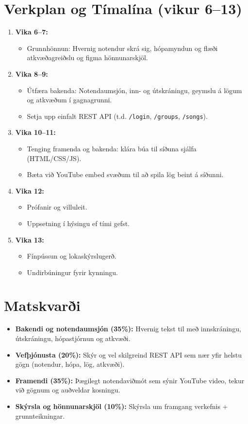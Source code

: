 \documentclass{article}
\begin{document}
\section{Verkplan og Tímalína (vikur 6--13)}
\begin{enumerate}[label=\arabic*.]
    \item \textbf{Vika 6--7:}  
    \begin{itemize}
        \item Grunnhönnun: Hvernig notendur skrá sig, hópamyndun og flæði atkvæðagreiðslu og figma hönnunarskjöl.
    \end{itemize}
    \item \textbf{Vika 8--9:}  
    \begin{itemize}
        \item Útfæra bakenda: Notendaumsjón, inn- og útskráningu, geymslu á lögum og atkvæðum í gagnagrunni.
        \item Setja upp einfalt REST API (t.d. \texttt{/login}, \texttt{/groups}, \texttt{/songs}).
    \end{itemize}
    \item \textbf{Vika 10--11:}  
    \begin{itemize}
        \item Tenging framenda og bakenda: klára búa til síðuna sjálfa (HTML/CSS/JS).
        \item Bæta við YouTube embed svæðum til að spila lög beint á síðunni.
    \end{itemize}
    \item \textbf{Vika 12:}  
    \begin{itemize}
        \item Prófanir og villuleit.
        \item Uppsetning í hýsingu ef tími gefst.
    \end{itemize}
    \item \textbf{Vika 13:}  
    \begin{itemize}
        \item Fínpússun og lokaskýrslugerð.
        \item Undirbúningur fyrir kynningu.
    \end{itemize}
\end{enumerate}

\section{Matskvarði}
\begin{itemize}
    \item \textbf{Bakendi og notendaumsjón (35\%):}  
    Hvernig tekst til með innskráningu, útskráningu, hópastjórnun og atkvæði.
    \item \textbf{Vefþjónusta (20\%):}  
    Skýr og vel skilgreind REST API sem nær yfir helstu gögn (notendur, hópa, lög, atkvæði).
    \item \textbf{Framendi (35\%):}  
    Þægilegt notendaviðmót sem sýnir YouTube video, tekur við gögnum og auðveldar kosningu.
    \item \textbf{Skýrsla og hönnunarskjöl (10\%):}  
    Skýrsla um framgang verkefnis + grunnteikningar.
\end{itemize}
\end{document}
